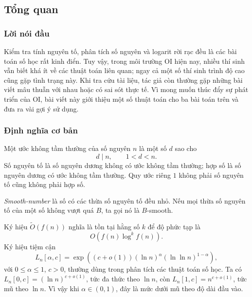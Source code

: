 \documentclass[11pt]{article}
\begin{document}
\renewcommand{\abstractname}{Tóm tắt}
\begin{abstract}
Bài viết thảo luận ba bài toán số học lâu đời: kiểm tra tính nguyên tố, phân
tích số nguyên và logarit rời rạc. Nội dung điểm lại một số thuật toán đã phổ
biến trong OI, nêu các tính chất đặc biệt của chúng, đồng thời giới thiệu vài
thuật toán tốt nhưng chưa được dùng rộng rãi trong OI.
\end{abstract}

\subsection{Tổng quan}

\subsubsection{Lời nói đầu}

Kiểm tra tính nguyên tố, phân tích số nguyên và logarit rời rạc đều là các bài
toán số học rất kinh điển. Tuy vậy, trong môi trường OI hiện nay, nhiều thí
sinh vẫn biết khá ít về các thuật toán liên quan; ngay cả một số thí sinh trình
độ cao cũng gặp tình trạng này. Khi tra cứu tài liệu, tác giả còn thường gặp
những bài viết mâu thuẫn với nhau hoặc có sai sót thực tế. Vì mong muốn thúc
đẩy sự phát triển của OI, bài viết này giới thiệu một số thuật toán cho ba bài
toán trên và đưa ra vài gợi ý sử dụng.

\subsubsection{Định nghĩa cơ bản}

Một ước không tầm thường của số nguyên \(n\) là một số \(d\) sao cho
\[
  d\mid n,\qquad 1<d<n.
\]
Số nguyên tố là số nguyên dương không có ước không tầm thường; hợp số là số
nguyên dương có ước không tầm thường. Quy ước riêng \(1\) không phải số nguyên
tố cũng không phải hợp số.

\emph{Smooth-number} là số có các thừa số nguyên tố đều nhỏ. Nếu mọi thừa số
nguyên tố của một số không vượt quá \(B\), ta gọi nó là \(B\)-smooth.

Ký hiệu \(\tilde O(f(n))\) nghĩa là tồn tại hằng số \(k\) để độ phức tạp là
\[
  O(f(n)\log^k f(n)).
\]
Ký hiệu tiệm cận
\[
  L_n[\alpha,c]=
  \exp\!\left((c+o(1))(\ln n)^\alpha(\ln\ln n)^{1-\alpha}\right),
\]
với \(0\le\alpha\le 1\), \(c>0\), thường dùng trong phân tích các thuật toán số
học. Ta có \(L_n[0,c]=(\ln n)^{c+o(1)}\), tức đa thức theo \(\ln n\), còn
\(L_n[1,c]=n^{c+o(1)}\), tức mũ theo \(\ln n\). Vì vậy khi
\(\alpha\in(0,1)\), đây là mức dưới mũ theo độ dài đầu vào.
\end{document}
